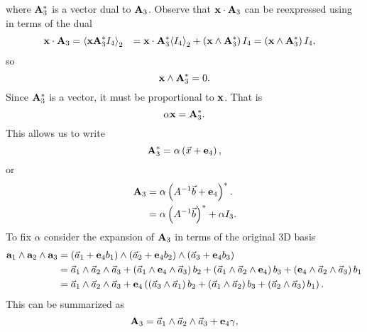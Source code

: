 where \( \mathbf{A}_3^{*} \) is a vector dual to \( \mathbf{A}_3 \).  Observe that \( \mathbf{x} \cdot \mathbf{A}_3 \) can be reexpressed using in terms of the dual
\begin{equation}\label{eqn:hyperwedge:260}
\begin{aligned}
\mathbf{x} \cdot \mathbf{A}_3
&= {\left\langle{{ \mathbf{x}\mathbf{A}_3^{*}I_4 }}\right\rangle}_{2}
&=
\mathbf{x} \cdot \mathbf{A}_3^{*} {\left\langle{{ I_4 }}\right\rangle}_{2} + \left( \mathbf{x} \wedge \mathbf{A}_3^{*} \right) I_4
&=
\left( \mathbf{x} \wedge \mathbf{A}_3^{*} \right) I_4,
\end{aligned}
\end{equation}
so
\begin{equation}\label{eqn:hyperwedge:280}
\mathbf{x} \wedge \mathbf{A}_3^{*} = 0.
\end{equation}
Since \( \mathbf{A}_3^{*} \) is a vector, it must be proportional to \( \mathbf{x} \).  That is
\begin{equation}\label{eqn:hyperwedge:300}
\alpha \mathbf{x} = \mathbf{A}_3^{*}.
\end{equation}
This allows us to write
\begin{equation}\label{eqn:hyperwedge:320}
\mathbf{A}_3^{*} = \alpha \left( \vec{x} + \mathbf{e}_4 \right),
\end{equation}
or
\begin{equation}\label{eqn:hyperwedge:340}
\begin{aligned}
\mathbf{A}_3
&= \alpha \left( A^{-1} \vec{b} + \mathbf{e}_4 \right)^{*}. \\
&= \alpha \left( A^{-1} \vec{b} \right)^{*} + \alpha I_3.
\end{aligned}
\end{equation}
To fix \( \alpha \) consider the expansion of \( \mathbf{A}_3 \) in terms of the original 3D basis
\begin{equation}\label{eqn:hyperwedge:360}
\begin{aligned}
\mathbf{a}_1 \wedge \mathbf{a}_2 \wedge \mathbf{a}_3
&=
\left( \vec{a}_1 + \mathbf{e}_4 b_1 \right)
\wedge
\left( \vec{a}_2 + \mathbf{e}_4 b_2 \right)
\wedge
\left( \vec{a}_3 + \mathbf{e}_4 b_3 \right) \\
&=
\vec{a}_1
\wedge
\vec{a}_2
\wedge
\vec{a}_3
+
\left(
\vec{a}_1 \wedge \mathbf{e}_4 \wedge \vec{a}_3
\right) b_2
+
\left(
\vec{a}_1 \wedge \vec{a}_2 \wedge \mathbf{e}_4
\right) b_3
+
\left(
\mathbf{e}_4 \wedge \vec{a}_2 \wedge \vec{a}_3
\right) b_1 \\
&=
\vec{a}_1
\wedge
\vec{a}_2
\wedge
\vec{a}_3
+
\mathbf{e}_4 \left(
   \left(
   \vec{a}_3 \wedge \vec{a}_1
   \right) b_2
   +
   \left(
   \vec{a}_1 \wedge \vec{a}_2
   \right) b_3
   +
   \left(
   \vec{a}_2 \wedge \vec{a}_3
   \right) b_1
\right).
\end{aligned}
\end{equation}
This can be summarized as
\begin{equation}\label{eqn:hyperwedge:380}
\mathbf{A}_3 =
\vec{a}_1 \wedge \vec{a}_2 \wedge \vec{a}_3
+ \mathbf{e}_4 \gamma,
\end{equation}
